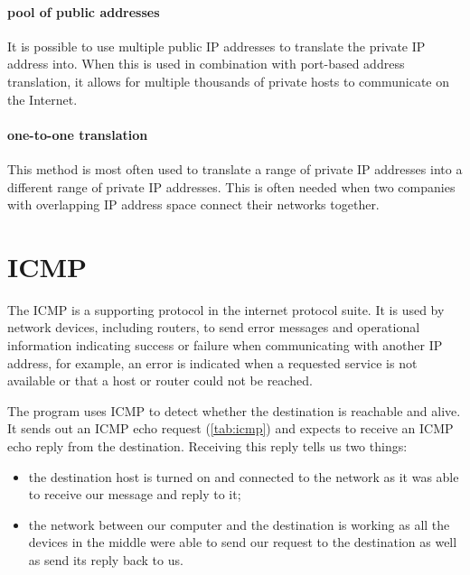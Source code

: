 \paragraph{pool of public addresses}
It is possible to use multiple public \acs{IP} addresses to translate the private \acs{IP} address into.
When this is used in combination with port-based address translation, it allows for multiple thousands of private hosts to communicate on the Internet.

\paragraph{one-to-one translation}
This method is most often used to translate a range of private \acs{IP} addresses into a different range of private \acs{IP} addresses.
This is often needed when two companies with overlapping \acs{IP} address space connect their networks together.




\section{\Acl{ICMP}}
\label{sec:ip-icmp}

The \acf{ICMP} is a supporting protocol in the internet protocol suite.
It is used by network devices, including routers, to send error messages and operational information indicating success or failure when communicating with another \acs{IP} address, for example, an error is indicated when a requested service is not available or that a host or router could not be reached.

The program  uses \acs{ICMP} to detect whether the destination is reachable and alive.
It sends out an \acs{ICMP} echo request (\cref{tab:icmp}) and expects to receive an \acs{ICMP} echo reply from the destination.
Receiving this reply tells us two things:
\begin{itemize}
\item
   the destination host is turned on and connected to the network as it was able to receive our message and reply to it;
\item
   the network between our computer and the destination is working as all the devices in the middle were able to send our request to the destination as well as send its reply back to us.
\end{itemize}

